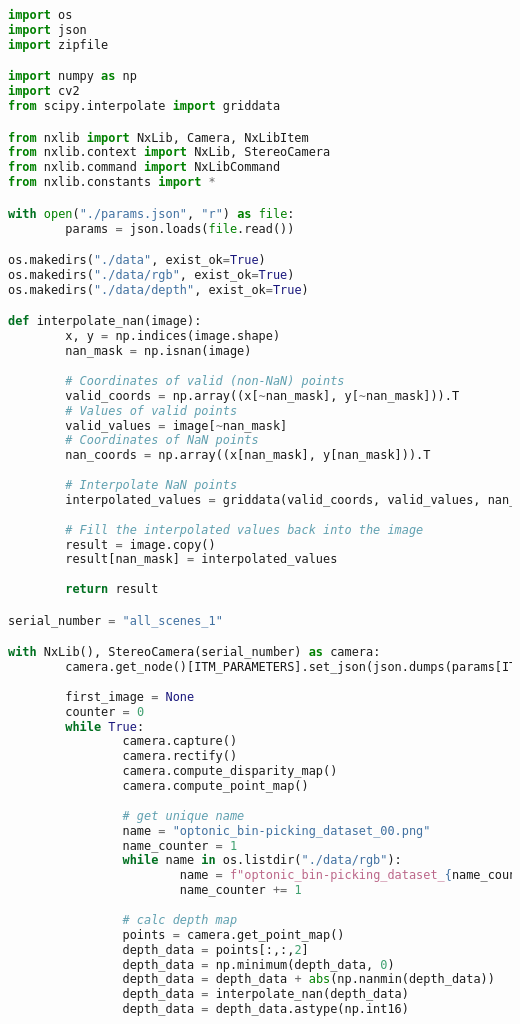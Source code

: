 		\begin{lstlisting}[language=Python,caption=Capturing images from a file camera with depth image scaling, label=lst:file-camera]
import os
import json
import zipfile

import numpy as np
import cv2
from scipy.interpolate import griddata

from nxlib import NxLib, Camera, NxLibItem
from nxlib.context import NxLib, StereoCamera
from nxlib.command import NxLibCommand
from nxlib.constants import *

with open("./params.json", "r") as file:
		params = json.loads(file.read())

os.makedirs("./data", exist_ok=True)
os.makedirs("./data/rgb", exist_ok=True)
os.makedirs("./data/depth", exist_ok=True)

def interpolate_nan(image):
		x, y = np.indices(image.shape)
		nan_mask = np.isnan(image)
		
		# Coordinates of valid (non-NaN) points
		valid_coords = np.array((x[~nan_mask], y[~nan_mask])).T
		# Values of valid points
		valid_values = image[~nan_mask]
		# Coordinates of NaN points
		nan_coords = np.array((x[nan_mask], y[nan_mask])).T
		
		# Interpolate NaN points
		interpolated_values = griddata(valid_coords, valid_values, nan_coords, method='linear')
		
		# Fill the interpolated values back into the image
		result = image.copy()
		result[nan_mask] = interpolated_values
		
		return result

serial_number = "all_scenes_1"

with NxLib(), StereoCamera(serial_number) as camera:
		camera.get_node()[ITM_PARAMETERS].set_json(json.dumps(params[ITM_PARAMETERS]), True)
		
		first_image = None
		counter = 0
		while True:
				camera.capture()
				camera.rectify()
				camera.compute_disparity_map()
				camera.compute_point_map()
				
				# get unique name
				name = "optonic_bin-picking_dataset_00.png"
				name_counter = 1
				while name in os.listdir("./data/rgb"):
						name = f"optonic_bin-picking_dataset_{name_counter:02}.png"
						name_counter += 1
				
				# calc depth map
				points = camera.get_point_map()
				depth_data = points[:,:,2]
				depth_data = np.minimum(depth_data, 0)
				depth_data = depth_data + abs(np.nanmin(depth_data))
				depth_data = interpolate_nan(depth_data)
				depth_data = depth_data.astype(np.int16)
				

\end{lstlisting}
